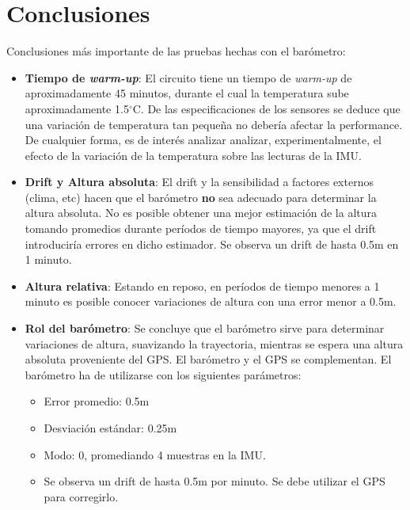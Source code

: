 \documentclass[main]{subfiles}
\newcommand{\degc}{$^\circ$C}
\begin{document}
\section{Conclusiones}
\label{sec:conclusiones}

Conclusiones más importante de las pruebas hechas con el barómetro:

\begin{itemize}
\item \textbf{Tiempo de \textit{warm-up}}: El circuito tiene un tiempo de \textit{warm-up} de aproximadamente 45 minutos, durante el cual la temperatura sube aproximadamente 1.5\degc. De las especificaciones de los sensores se deduce que una variación de temperatura tan pequeña no debería afectar la performance. De cualquier forma, es de interés analizar analizar, experimentalmente, el efecto de la variación de la temperatura sobre las lecturas de la IMU.
\item \textbf{Drift y Altura absoluta}: El drift y la sensibilidad a factores externos (clima, etc) hacen que el barómetro \textbf{no} sea adecuado para determinar la altura absoluta. No es posible obtener una mejor estimación de la altura tomando promedios durante períodos de tiempo mayores, ya que el drift introduciría errores en dicho estimador. Se observa un drift de hasta 0.5m en 1 minuto.
\item \textbf{Altura relativa}: Estando en reposo, en períodos de tiempo menores a 1 minuto es posible conocer variaciones de altura con una error menor a 0.5m.
\item \textbf{Rol del barómetro}: Se concluye que el barómetro sirve para determinar variaciones de altura, suavizando la trayectoria, mientras se espera una altura absoluta proveniente del GPS. El barómetro y el GPS se complementan. El barómetro ha de utilizarse con los siguientes parámetros:
  \begin{itemize}
  \item Error promedio: 0.5m
  \item Desviación estándar: 0.25m
  \item Modo: 0, promediando 4 muestras en la IMU.
  \item Se observa un drift de hasta 0.5m por minuto. Se debe utilizar el GPS para corregirlo.
  \end{itemize}
\end{itemize}
\end{document}
